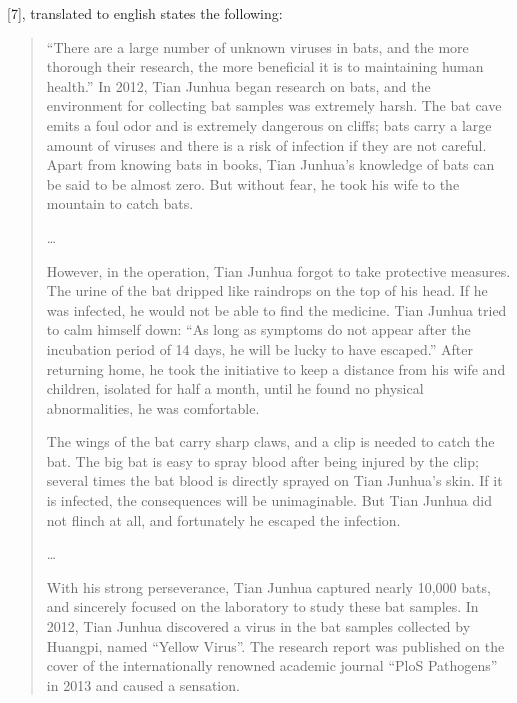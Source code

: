 \documentclass[11pt]{article}
\begin{document}
[7], translated to english states the following:
\begin{quote}
``There are a large number of unknown viruses in bats, and the more thorough their research, the more beneficial it is to maintaining human health.'' In 2012, Tian Junhua began research on bats, and the environment for collecting bat samples was extremely harsh. The bat cave emits a foul odor and is extremely dangerous on cliffs; bats carry a large amount of viruses and there is a risk of infection if they are not careful. Apart from knowing bats in books, Tian Junhua’s knowledge of bats can be said to be almost zero. But without fear, he took his wife to the mountain to catch bats.

\ldots{}

However, in the operation, Tian Junhua forgot to take protective measures. The urine of the bat dripped like raindrops on the top of his head. If he was infected, he would not be able to find the medicine. Tian Junhua tried to calm himself down: ``As long as symptoms do not appear after the incubation period of 14 days, he will be lucky to have escaped.'' After returning home, he took the initiative to keep a distance from his wife and children, isolated for half a month, until he found no physical abnormalities, he was comfortable.

The wings of the bat carry sharp claws, and a clip is needed to catch the bat. The big bat is easy to spray blood after being injured by the clip; several times the bat blood is directly sprayed on Tian Junhua’s skin. If it is infected, the consequences will be unimaginable. But Tian Junhua did not flinch at all, and fortunately he escaped the infection.

\ldots{}

With his strong perseverance, Tian Junhua captured nearly 10,000 bats, and sincerely focused on the laboratory to study these bat samples. In 2012, Tian Junhua discovered a virus in the bat samples collected by Huangpi, named ``Yellow Virus''. The research report was published on the cover of the internationally renowned academic journal ``PloS Pathogens'' in 2013 and caused a sensation.
\end{quote}
\end{document}
